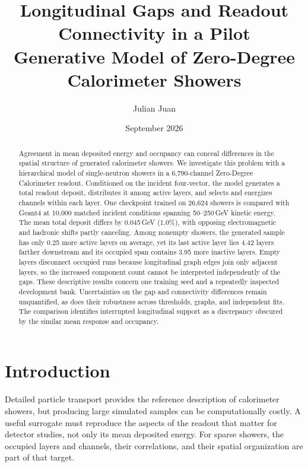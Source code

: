 \documentclass[11pt]{article}
\title{Longitudinal Gaps and Readout Connectivity in a Pilot\\Generative Model of Zero-Degree Calorimeter Showers}
\author{Julian Juan}
\date{September 2026}
\begin{document}
\maketitle

\begin{abstract}
Agreement in mean deposited energy and occupancy can conceal differences in the spatial structure of generated calorimeter showers. We investigate this problem with a hierarchical model of single-neutron showers in a 6,790-channel Zero-Degree Calorimeter readout. Conditioned on the incident four-vector, the model generates a total readout deposit, distributes it among active layers, and selects and energizes channels within each layer. One checkpoint trained on 26,624 showers is compared with Geant4 at 10,000 matched incident conditions spanning 50--250\,GeV kinetic energy. The mean total deposit differs by 0.045\,GeV (1.0\%), with opposing electromagnetic and hadronic shifts partly canceling. Among nonempty showers, the generated sample has only 0.25 more active layers on average, yet its last active layer lies 4.42 layers farther downstream and its occupied span contains 3.95 more inactive layers. Empty layers disconnect occupied runs because longitudinal graph edges join only adjacent layers, so the increased component count cannot be interpreted independently of the gaps. These descriptive results concern one training seed and a repeatedly inspected development bank. Uncertainties on the gap and connectivity differences remain unquantified, as does their robustness across thresholds, graphs, and independent fits. The comparison identifies interrupted longitudinal support as a discrepancy obscured by the similar mean response and occupancy.
\end{abstract}

\section{Introduction}

Detailed particle transport provides the reference description of calorimeter showers, but producing large simulated samples can be computationally costly. A useful surrogate must reproduce the aspects of the readout that matter for detector studies, not only its mean deposited energy. For sparse showers, the occupied layers and channels, their correlations, and their spatial organization are part of that target.
\end{document}
